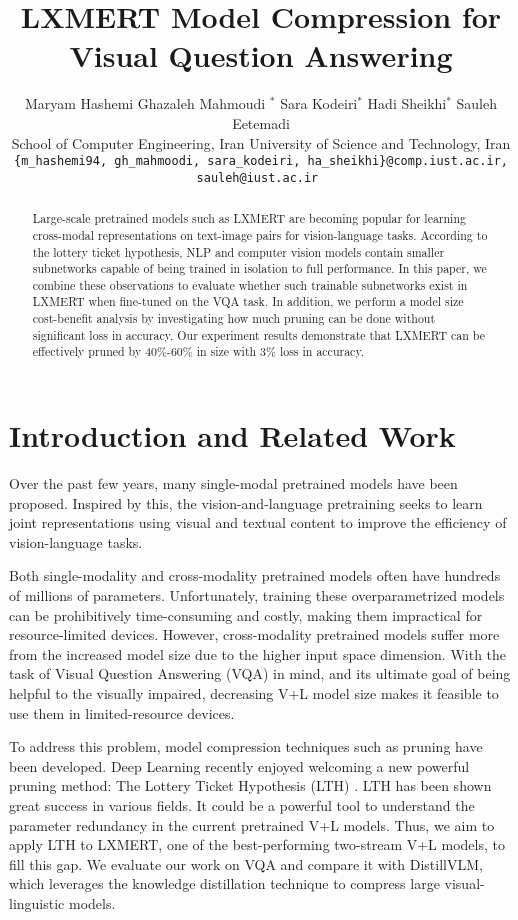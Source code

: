 \documentclass[11pt,a4paper]{article}
\title{LXMERT Model Compression for Visual Question Answering}
\author{
Maryam Hashemi \hspace{0.2cm} Ghazaleh Mahmoudi  \Thanks{ These authors contributed equally.}$^*$ \hspace{0.2cm} Sara Kodeiri$^*$ \hspace{0.2cm} Hadi Sheikhi$^*$\hspace{0.2cm} Sauleh Eetemadi  \\
School of Computer Engineering,
Iran University of Science and Technology, Iran \\
\small{\texttt{\{m\_hashemi94, gh\_mahmoodi, sara\_kodeiri, ha\_sheikhi\}@comp.iust.ac.ir, sauleh@iust.ac.ir }}}
\begin{document}
\maketitle
\begin{abstract}
Large-scale pretrained models such as LXMERT are becoming popular for learning cross-modal representations on text-image pairs for vision-language tasks. According to the lottery ticket hypothesis, NLP and computer vision models contain smaller subnetworks capable of being trained in isolation to full performance. In this paper, we combine these observations to evaluate whether such trainable subnetworks exist in LXMERT when fine-tuned on the VQA task. In addition, we perform a model size cost-benefit analysis by investigating how much pruning can be done without significant loss in accuracy. Our experiment results demonstrate that LXMERT can be effectively pruned by 40\%-60\% in size with 3\% loss in accuracy. 
\end{abstract}

\section{Introduction and Related Work}
Over the past few years, many single-modal pretrained models have been proposed. Inspired by this, the vision-and-language pretraining seeks to learn joint representations using visual and textual content to improve the efficiency of vision-language tasks.

Both single-modality and cross-modality pretrained models often have hundreds of millions of parameters. Unfortunately, training these overparametrized models can be prohibitively time-consuming and costly, making them impractical for resource-limited devices. However, cross-modality pretrained models suffer more from the increased model size due to the higher input space dimension. With the task of Visual Question Answering (VQA) \cite{Antol2015} in mind, and its ultimate goal of being helpful to the visually impaired, decreasing V+L model size makes it feasible to use them in limited-resource devices.

To address this problem, model compression techniques such as pruning have been developed. Deep Learning recently enjoyed welcoming a new powerful pruning method: The Lottery Ticket Hypothesis (LTH) \cite{frankle2018the}. LTH has been shown great success in various fields. It could be a powerful tool to understand the parameter redundancy in the current pretrained V+L models. Thus, we aim to apply LTH to LXMERT\cite{Tan2020}, one of the best-performing two-stream V+L models, to fill this gap. We evaluate our work on VQA \cite{Antol2015} and compare it with DistillVLM\cite{Fang_2021_ICCV}, which leverages the knowledge distillation technique to compress large visual-linguistic models.
\end{document}
